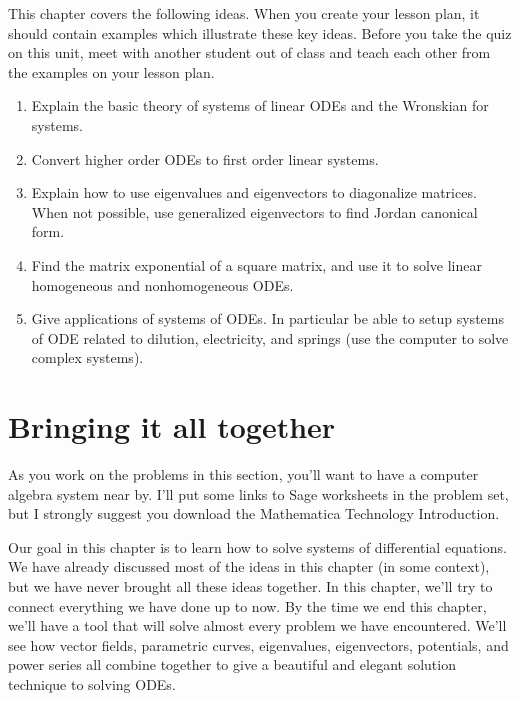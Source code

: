 
This chapter covers the following ideas. When you create your lesson plan, it should contain examples which illustrate these key ideas. Before you take the quiz on this unit, meet with another student out of class and teach each other from the examples on your lesson plan. 


\begin{enumerate}
\item Explain the basic theory of systems of linear ODEs and the Wronskian for systems.
\item Convert higher order ODEs to first order linear systems.
\item Explain how to use eigenvalues and eigenvectors to diagonalize matrices. When not possible, use generalized eigenvectors to find Jordan canonical form.
\item Find the matrix exponential of a square matrix, and use it to solve linear homogeneous and nonhomogeneous ODEs. 
\item Give applications of systems of ODEs. In particular be able to setup systems of ODE related to dilution, electricity, and springs (use the computer to solve complex systems). 
\end{enumerate}



\section{Bringing it all together}
As you work on the problems in this section, you'll want to have a computer algebra system near by.  I'll put some links to Sage worksheets in the problem set, but I strongly suggest you download the Mathematica Technology Introduction.

Our goal in this chapter is to learn how to solve systems of differential equations.  We have already discussed most of the ideas in this chapter (in some context), but we have never brought all these ideas together.  In this chapter, we'll try to connect everything we have done up to now. By the time we end this chapter, we'll have a tool that will solve almost every problem we have encountered. We'll see how vector fields, parametric curves, eigenvalues, eigenvectors, potentials, and power series all combine together to give a beautiful and elegant solution technique to solving ODEs.

